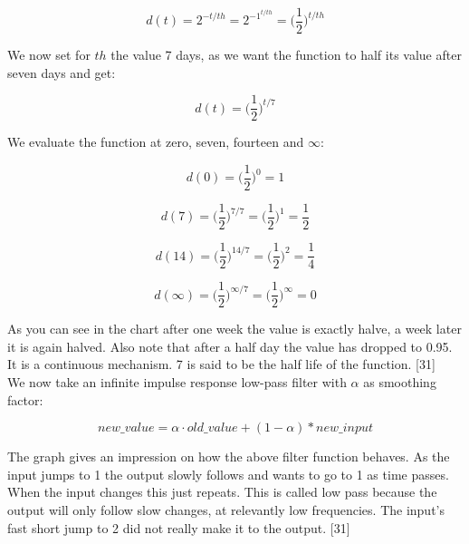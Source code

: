 \begin{equation}
d(t) =  2^{-t/th} =  2^{-1^{t/th}} = \bigg(\frac{1}{2}\bigg)^{t/th}
\end{equation}

We now set for $th$ the value 7 days, as we want the function to half its value after seven days and get:

\begin{equation}
d(t) = \bigg(\frac{1}{2}\bigg)^{t/7}
\end{equation}

We evaluate the function at zero, seven, fourteen and $\infty$:

\begin{equation}
d(0) = \bigg(\frac{1}{2}\bigg)^{0} = 1
\end{equation}

\begin{equation}
d(7) = \bigg(\frac{1}{2}\bigg)^{7/7} = \bigg(\frac{1}{2}\bigg)^{1} = \frac{1}{2} 
\end{equation}

\begin{equation}
d(14) = \bigg(\frac{1}{2}\bigg)^{14/7} = \bigg(\frac{1}{2}\bigg)^{2} = \frac{1}{4} 
\end{equation}

\begin{equation}
d(\infty) = \bigg(\frac{1}{2}\bigg)^{\infty/7} = \bigg(\frac{1}{2}\bigg)^{\infty} = 0 
\end{equation}


As you can see in the chart after one week the value is exactly halve, a week later it is again halved. Also note that after a half day the value has dropped to 0.95. It is a continuous mechanism. 7 is said to be the half life of the function. [31]\\

We now take an infinite impulse response low-pass filter with $\alpha$ as smoothing factor:

\begin{equation}
new\_value = \alpha \cdot old\_value + (1-\alpha) * new\_input
\end{equation}

The graph gives an impression on how the above filter function behaves. As the input jumps to 1 the output slowly follows and wants to go to 1 as time passes. When the input changes this just repeats. This is called low pass because the output will only follow slow changes, at relevantly low frequencies. The input’s fast short jump to 2 did not really make it to the output. [31]\\


